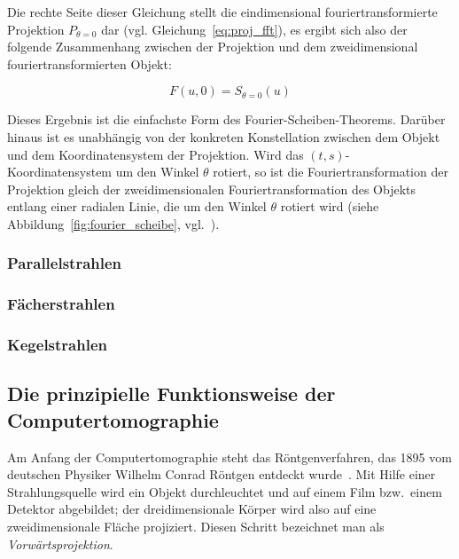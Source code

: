 Die rechte Seite dieser Gleichung stellt die eindimensional fouriertransformierte Projektion $P_{\theta = 0}$ dar (vgl.
Gleichung~\ref{eq:proj_fft}), es ergibt sich also der folgende Zusammenhang zwischen der Projektion und dem
zweidimensional fouriertransformierten Objekt:

\begin{equation}
    F(u, 0) = S_{\theta = 0}(u)
\end{equation}

Dieses Ergebnis ist die einfachste Form des Fourier-Scheiben-Theorems. Darüber hinaus ist es unabhängig von der
konkreten Konstellation zwischen dem Objekt und dem Koordinatensystem der Projektion. Wird das
$(t, s)$-Koordinatensystem um den Winkel $\theta$ rotiert, so ist die Fouriertransformation der Projektion gleich der
zweidimensionalen Fouriertransformation des Objekts entlang einer radialen Linie, die um den Winkel $\theta$ rotiert
wird (siehe Abbildung~\ref{fig:fourier_scheibe}, vgl.~\cite{kakslan}).

\subsubsection{Parallelstrahlen}

\subsubsection{Fächerstrahlen}

\subsubsection{Kegelstrahlen}

\subsection{Die prinzipielle Funktionsweise der Computertomographie}

Am Anfang der Computertomographie steht das Röntgenverfahren, das 1895 vom deutschen Physiker Wilhelm Conrad Röntgen
entdeckt wurde~\cite{roentgen}. Mit Hilfe einer Strahlungsquelle wird ein Objekt durchleuchtet und auf einem Film bzw.\
einem Detektor abgebildet; der dreidimensionale Körper wird also auf eine zweidimensionale Fläche projiziert. Diesen
Schritt bezeichnet man als \textit{Vorwärtsprojektion}.

